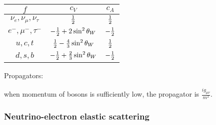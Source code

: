 \begin{table}[htbp]
    \centering
    \begin{tabular}{|c c c|}
        \hline
        $f$ & $c_V$ & $c_A$ \\
        \hline
        $\nu_e,\nu_\mu,\nu_\tau$ & $\frac{1}{2}$ & $\frac{1}{2}$ \\
        \hline
        $e^-,\mu^-,\tau^-$ & $-\frac{1}{2}+2\sin^2{\theta_W}$ & $-\frac{1}{2}$ \\
        \hline
        $u,c,t$ & $\frac{1}{2}-\frac{4}{3}\sin^2{\theta_W}$ & $\frac{1}{2}$ \\
        \hline
        $d,s,b$ & $-\frac{1}{2}+\frac{2}{3}\sin^2{\theta_W}$ & $-\frac{1}{2}$ \\
        \hline
    \end{tabular}
\end{table}

Propagators:


when momentum of bosons is sufficiently low, the propagator is $\frac{ig_{\mu\nu}}{m^2}$.

\subsubsection{Neutrino-electron elastic scattering}


